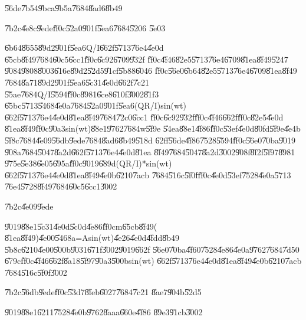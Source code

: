 \documentclass{article}
\begin{document}
\U{56de}\U{7b54}\U{9bca}\U{9b5a}\U{7684}\U{8ad6}\U{8b49}

\U{7b2c}\U{4e8c}\U{9ede}\U{ff0c}\U{52a0}\U{901f}\U{5ea6}\U{7684}\U{5206}%
\U{5e03}

\U{6b64}\U{8655}\U{89d2}\U{901f}\U{5ea6}Q/I\U{662f}\U{5713}\U{76e4}\U{4e0d}%
\U{65cb}\U{8f49}\U{7684}\U{60c5}\U{6cc1}\U{ff0c}\U{6c92}\U{6709}\U{932f}%
\U{ff0c}\U{4f46}\U{82e5}\U{5713}\U{76e4}\U{6709}\U{81ea}\U{8f49}\U{5247}%
\U{9084}\U{9808}\U{8003}\U{616e}\U{89d2}\U{52d5}\U{91cf}\U{5b88}\U{6046}%
\U{ff0c}\U{56e0}\U{6b64}\U{82e5}\U{5713}\U{76e4}\U{6709}\U{81ea}\U{8f49}%
\U{7684}\U{8a71}\U{89d2}\U{901f}\U{5ea6}\U{5c31}\U{4e0d}\U{662f}\U{7c21}%
\U{55ae}\U{7684}Q/I\U{5594}\U{ff0c}\U{8981}\U{6ce8}\U{610f}\U{3002}\U{81f3}%
\U{65bc}\U{5713}\U{5468}\U{4e0a}\U{7684}\U{52a0}\U{901f}\U{5ea6}(QR/I)sin(wt)%
\U{662f}\U{5713}\U{76e4}\U{4e0d}\U{81ea}\U{8f49}\U{7684}\U{72c0}\U{6cc1}%
\U{ff0c}\U{6c92}\U{932f}\U{ff0c}\U{4f46}\U{662f}\U{ff0c}\U{82e5}\U{4e0d}%
\U{81ea}\U{8f49}\U{ff0c}\U{90a3}sin(wt)\U{88e1}\U{9762}\U{7684}w\U{5f9e}%
\U{54ea}\U{88e1}\U{4f86}\U{ff0c}\U{53ef}\U{4e0d}\U{80fd}\U{5f9e}\U{4e4b}%
\U{5f8c}\U{7684}\U{4e09}\U{56db}\U{9ede}\U{7684}\U{8ad6}\U{8b49}\U{518d}%
\U{62ff}\U{56de}\U{4f86}\U{7528}\U{5594}\U{ff0c}\U{56e0}\U{70ba}\U{9019}%
\U{908a}\U{7684}\U{5047}\U{8a2d}\U{662f}\U{5713}\U{76e4}\U{4e0d}\U{81ea}%
\U{8f49}\U{7684}\U{5047}\U{8a2d}\U{3002}\U{908f}\U{8f2f}\U{5f97}\U{8981}%
\U{975e}\U{5e38}\U{6e05}\U{695a}\U{ff0c}\U{9019}\U{689d}(QR/I)*sin(wt)%
\U{662f}\U{5713}\U{76e4}\U{4e0d}\U{81ea}\U{8f49}\U{4e0b}\U{6210}\U{7acb}%
\U{7684}\U{516c}\U{5f0f}\U{ff0c}\U{4e0d}\U{53ef}\U{7528}\U{4e0a}\U{5713}%
\U{76e4}\U{5728}\U{8f49}\U{7684}\U{60c5}\U{6cc1}\U{3002}

\U{7b2c}\U{4e09}\U{9ede}

\U{9019}\U{88e1}\U{5c31}\U{4e0d}\U{5c0d}\U{4e86}\U{ff0c}m\U{65cb}\U{8f49}(%
\U{81ea}\U{8f49})\U{4e00}\U{5468}a=Asin(wt)\U{4e26}\U{4e0d}\U{4fdd}\U{8b49}%
\U{5b8c}\U{6210}\U{4e00}\U{500b}\U{9031}\U{671f}\U{3002}\U{9019}\U{662f}%
\U{56e0}\U{70ba}\U{4f60}\U{7528}\U{4e86}\U{4e0a}\U{9762}\U{7684}\U{7d50}%
\U{679c}\U{ff0c}\U{4f46}\U{662f}\U{8a18}\U{5f97}\U{90a3}\U{500b}sin(wt)%
\U{662f}\U{5713}\U{76e4}\U{4e0d}\U{81ea}\U{8f49}\U{4e0b}\U{6210}\U{7acb}%
\U{7684}\U{516c}\U{5f0f}\U{3002}

\U{7b2c}\U{56db}\U{9ede}\U{ff0c}\U{53d7}\U{8feb}\U{6027}\U{7684}\U{7c21}%
\U{8ae7}\U{904b}\U{52d5}

\U{9019}\U{88e1}\U{6211}\U{7528}\U{4e0b}\U{9762}\U{8aaa}\U{660e}\U{4f86}%
\U{89e3}\U{91cb}\U{3002}
\end{document}
